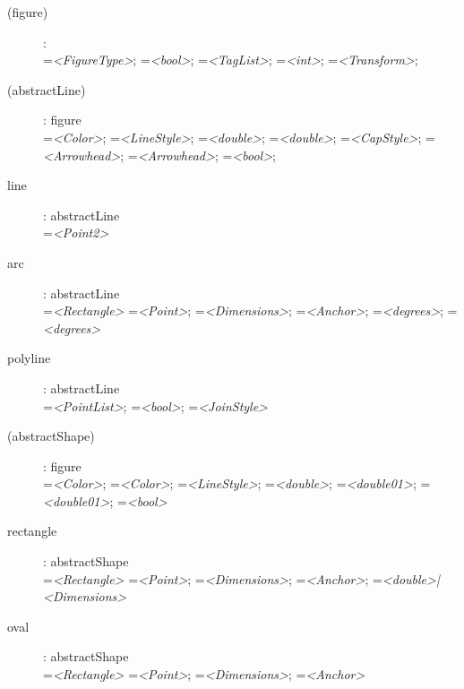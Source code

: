 \begin{flushleft}
\begin{description}

\item[(figure)]: \\
    =\textit{<FigureType>};
    =\textit{<bool>};
    =\textit{<TagList>};
    =\textit{<int>};
    =\textit{<Transform>};

\item[(abstractLine)]: figure \\
    =\textit{<Color>};
    =\textit{<LineStyle>};
    =\textit{<double>};
    =\textit{<double>};
    =\textit{<CapStyle>};
    =\textit{<Arrowhead>};
    =\textit{<Arrowhead>};
    =\textit{<bool>};

\item[line]: abstractLine \\
    =\textit{<Point2>}

\item[arc]: abstractLine \\
    =\textit{<Rectangle>}
    =\textit{<Point>};
    =\textit{<Dimensions>};
    =\textit{<Anchor>};
    =\textit{<degrees>};
    =\textit{<degrees>}

\item[polyline]: abstractLine \\
    =\textit{<PointList>};
    =\textit{<bool>};
    =\textit{<JoinStyle>}

\item[(abstractShape)]: figure \\
    =\textit{<Color>};
    =\textit{<Color>};
    =\textit{<LineStyle>};
    =\textit{<double>};
    =\textit{<double01>};
    =\textit{<double01>};
    =\textit{<bool>}

\item[rectangle]: abstractShape \\
    =\textit{<Rectangle>}
    =\textit{<Point>};
    =\textit{<Dimensions>};
    =\textit{<Anchor>};
    =\textit{<double>|<Dimensions>}

\item[oval]: abstractShape \\
    =\textit{<Rectangle>}
    =\textit{<Point>};
    =\textit{<Dimensions>};
    =\textit{<Anchor>}


\end{description}
\end{flushleft}
